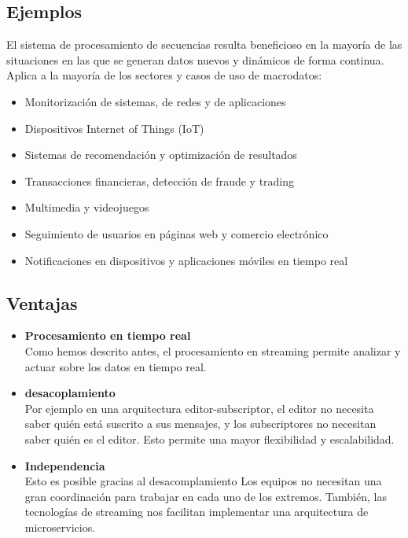 \documentclass[12pt]{article}
\begin{document}
\subsection{Ejemplos}

El sistema de procesamiento de secuencias resulta beneficioso en la mayoría de las situaciones en las que se generan datos nuevos y dinámicos
de forma continua. Aplica a la mayoría de los sectores y casos de uso de macrodatos:
\begin{itemize}
    \item Monitorización de sistemas, de redes y de aplicaciones
    \item Dispositivos Internet of Things (IoT)
    \item Sistemas de recomendación y optimización de resultados
    \item Transacciones financieras, detección de fraude y trading
    \item Multimedia y videojuegos
    \item Seguimiento de usuarios en páginas web y comercio electrónico
    \item Notificaciones en dispositivos y aplicaciones móviles en tiempo real
\end{itemize}

\subsection{Ventajas}

\begin{itemize}
    \item \textbf{Procesamiento en tiempo real}\\
    Como hemos descrito antes, el procesamiento en streaming permite analizar y actuar sobre los datos en tiempo real.
    \item \textbf{desacoplamiento}\\
    Por ejemplo en una arquitectura editor-subscriptor, el editor no necesita saber quién está suscrito a sus mensajes, 
    y los subscriptores no necesitan saber quién es el editor. Esto permite una mayor flexibilidad y escalabilidad.
    \item \textbf{Independencia}\\
    Esto es posible gracias al desacomplamiento Los equipos no necesitan una gran coordinación para trabajar en cada uno 
    de los extremos. También, las tecnologías de streaming nos facilitan implementar una arquitectura de microservicios.
\end{itemize}
\end{document}
